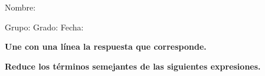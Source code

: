 \documentclass[12pt,addpoints]{exam}
\begin{document}
%

Nombre:\enspace\hrulefill

\vspace{5mm}

Grupo:\enspace\hrulefill
\enspace{}Grado:\enspace\hrulefill
\enspace{}Fecha:\enspace\hrulefill

\begin{questions}

\begin{EnvFullwidth}
  \sffamily\textbf{Une con una línea la respuesta que corresponde.}
\end{EnvFullwidth}



\begin{EnvFullwidth}
  \sffamily\textbf{Reduce los términos semejantes de las siguientes
  expresiones.}
\end{EnvFullwidth}


\vspace{\baselineskip}
\vspace{\baselineskip}


\vspace{\baselineskip}
\vspace{\baselineskip}


\vspace{\baselineskip}
\vspace{\baselineskip}


\vspace{\baselineskip}
\vspace{\baselineskip}



\end{questions}
\end{document}
